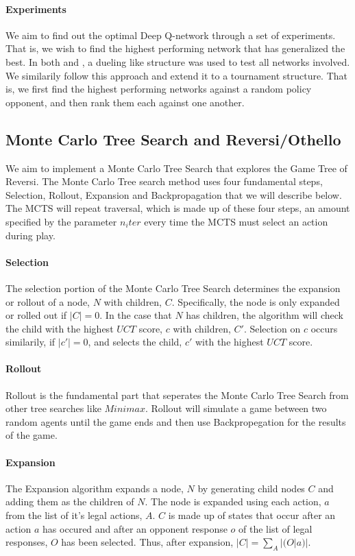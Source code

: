 \documentclass[../report.tex]{subfiles}
\begin{document}
\paragraph{Experiments}
We aim to find out the optimal Deep Q-network through a set of experiments. That is, we wish to find the highest performing network that has generalized the best. In both \citet{ree13} and \citet{VANECK20081999}, a dueling like structure was used to test all networks involved. We similarily follow this approach and extend it to a tournament structure. That is, we first find the highest performing networks against a random policy opponent, and then rank them each against one another.

\subsection{Monte Carlo Tree Search and Reversi/Othello}
We aim to implement a Monte Carlo Tree Search that explores the Game Tree of Reversi. The Monte Carlo Tree search method uses four fundamental steps, Selection, Rollout, Expansion and Backpropagation that we will describe below. The MCTS will repeat traversal, which is made up of these four steps, an amount specified by the parameter $n_iter$ every time the MCTS must select an action during play.

\paragraph{Selection}
The selection portion of the Monte Carlo Tree Search determines the expansion or rollout of a node, $N$ with children, $C$. Specifically, the node is only expanded or rolled out if $|C| = 0$. In the case that $N$ has children, the algorithm will check the child with the highest $UCT$ score, $c$ with children, $C'$. Selection on $c$ occurs similarily, if $|c'| = 0$, and selects the child, $c'$ with the highest $UCT$ score.

\paragraph{Rollout}
Rollout is the fundamental part that seperates the Monte Carlo Tree Search from other tree searches like $Minimax$. Rollout will simulate a game between two random agents until the game ends and then use Backpropegation for the results of the game.

\paragraph{Expansion}
The Expansion algorithm expands a node, $N$ by generating child nodes $C$ and adding them as the children of $N$. The node is expanded using each action, $a$ from the list of it's legal actions, $A$. $C$ is made up of states that occur after an action $a$ has occured and after an opponent response $o$ of the list of legal responses, $O$ has been selected. Thus, after expansion, $|C| = \sum_{A}|(O | a)|$.
\end{document}
